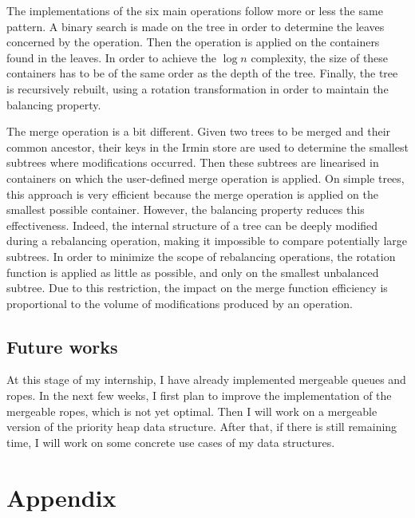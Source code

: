 \documentclass{article}
\newcommand{\irmin}{Irmin\xspace}
\newcommand{\ocaml}{OCaml\xspace}
\begin{document}
The implementations of the six main operations follow more or less the same pattern.
A binary search is made on the tree in order to determine the leaves concerned by the operation.
Then the operation is applied on the containers found in the leaves.
In order to achieve the $\log n$ complexity, the size of these containers has to be of the same order as the depth of the tree.
Finally, the tree is recursively rebuilt, using a rotation transformation in order to maintain the balancing property.

The merge operation is a bit different.
Given two trees to be merged and their common ancestor, their keys in the \irmin store are used to determine the smallest subtrees where modifications occurred.
Then these subtrees are linearised in containers on which the user-defined merge operation is applied.
On simple trees, this approach is very efficient because the merge operation is applied on the smallest possible container.
However, the balancing property reduces this effectiveness.
Indeed, the internal structure of a tree can be deeply modified during a rebalancing operation, making it impossible to compare potentially large subtrees.
In order to minimize the scope of rebalancing operations, the rotation function is applied as little as possible, and only on the smallest unbalanced subtree.
Due to this restriction, the impact on the merge function efficiency is proportional to the volume of modifications produced by  an operation.

\subsection{Future works}

At this stage of my internship, I have already implemented mergeable queues and ropes.
In the next few weeks, I first plan to improve the implementation of the mergeable ropes, which is not yet optimal.
Then I will work on a mergeable version of the priority heap data structure.
After that, if there is still remaining time, I will work on some concrete use cases of my data structures.

\nocite{*}



\newpage

\section*{Appendix}
\addtocounter{section}{1}
\setcounter{subsection}{0}
\renewcommand{\thesubsection}{\Alph{subsection}}
\end{document}
